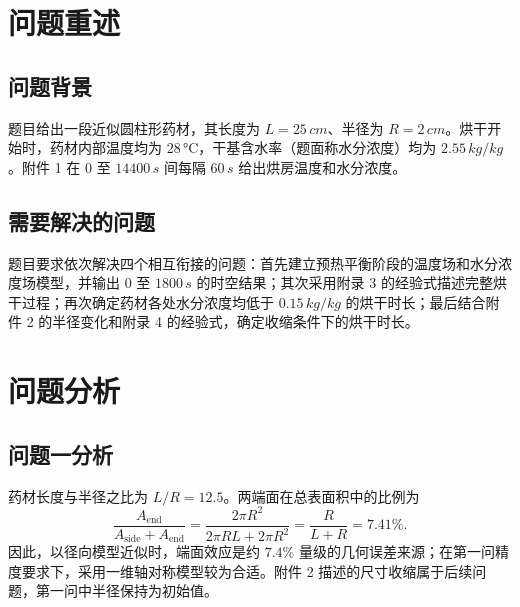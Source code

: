 \documentclass[withoutpreface,bwprint]{cumcmthesis}
\title{\titleemphasis{药材烘干过程的传热传质建模}}
\begin{document}
\maketitle
\begin{abstract}
\end{abstract}

\section{问题重述}

\subsection{问题背景}

题目给出一段近似圆柱形药材，其长度为 $L=25\,\si{cm}$、半径为 $R=2\,\si{cm}$。烘干开始时，药材内部温度均为 $28\,\si{\celsius}$，干基含水率（题面称水分浓度）均为 $2.55\,\si{kg/kg}$。附件 1 在 $0$ 至 $14400\,\si{s}$ 间每隔 $60\,\si{s}$ 给出烘房温度和水分浓度。

\subsection{需要解决的问题}

题目要求依次解决四个相互衔接的问题：首先建立预热平衡阶段的温度场和水分浓度场模型，并输出 $0$ 至 $1800\,\si{s}$ 的时空结果；其次采用附录 3 的经验式描述完整烘干过程；再次确定药材各处水分浓度均低于 $0.15\,\si{kg/kg}$ 的烘干时长；最后结合附件 2 的半径变化和附录 4 的经验式，确定收缩条件下的烘干时长。

\section{问题分析}

\subsection{问题一分析}

药材长度与半径之比为 $L/R=12.5$。两端面在总表面积中的比例为
\begin{equation}
\frac{A_{\mathrm{end}}}{A_{\mathrm{side}}+A_{\mathrm{end}}}
=\frac{2\pi R^2}{2\pi RL+2\pi R^2}
=\frac{R}{L+R}=7.41\% .
\label{eq:end_ratio}
\end{equation}
因此，以径向模型近似时，端面效应是约 $7.4\%$ 量级的几何误差来源；在第一问精度要求下，采用一维轴对称模型较为合适。附件 2 描述的尺寸收缩属于后续问题，第一问中半径保持为初始值。
\end{document}
